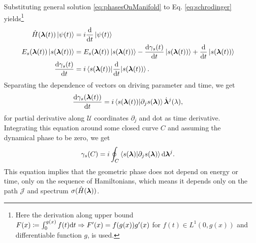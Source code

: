 

Substituting general solution \ref{eq:phasesOnManifold} to Eq. \ref{eq:schrodinger} yields\footnote{Here the derivation along upper bound $F(x)\coloneqq\int_0^{g(x)}f(t)\mathrm{d} t \Rightarrow F'(x)=f(g(x))g'(x)$ for $f(t)\in L^1(0,g(x))$ and differentiable function $g$, is used.} 
\begin{align}
    \hat{H}({\bm\lambda}(t))\ket{\psi(t)} &= i\frac{\mathrm{d} }{\mathrm{d} t}\ket{\psi(t)}\\
    E_s({\bm\lambda}(t)) \ket{s({\bm\lambda}(t))} &= E_s({\bm\lambda}(t))\ket{s({\bm\lambda}(t))} -\frac{\mathrm{d} \gamma_s(t)}{\mathrm{d} t}\ket{s({\bm\lambda}(t))}+ \frac{\mathrm{d} }{\mathrm{d} t}\ket{s({\bm\lambda}(t))}\\
    \frac{\mathrm{d} \gamma_s(t)}{\mathrm{d} t}&=i\braket{s({\bm\lambda}(t))|
    \frac{\mathrm{d} }{\mathrm{d} t}|s({\bm\lambda}(t))}.
\end{align}
 Separating the dependence of vectors on driving parameter and time, we get
\begin{equation}
    \frac{\mathrm{d} \gamma_s({\bm\lambda}(t))}{\mathrm{d} t} =i\braket{s({\bm\lambda}(t))|\partial_j s({\bm\lambda})} \dot{{\bm\lambda}}^j(\lambda),
\end{equation}
for partial derivative along $\mathcal U$ coordinates $\partial_j$ and dot as time derivative. Integrating this equation around some closed curve $C$ and assuming the dynamical phase to be zero, we get
\begin{equation}
    \gamma_s(C)=i\oint_C\braket{s({\bm\lambda})|\partial_j s({\bm\lambda})}\mathrm{d} {\bm\lambda}^j.
    \label{eq:gammaCoint}
\end{equation}
This equation implies that the geometric phase does not depend on energy or time, only on the sequence of Hamiltonians, which means it depends only on the path $\mathcal J$ and spectrum $\sigma(\hat{H}({\bm\lambda}))$.



